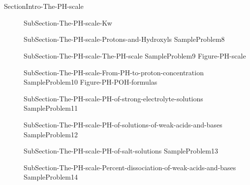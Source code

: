 \documentclass[main.tex]{subfiles}
\newcommand\chapterlabel{Ch-acidbase}\setcounter{figurenewcounter}{0}\setcounter{tablenewcounter}{0}\setcounter{formulanewcounter}{0}
\begin{document}
\section{\color{blue!30!black}{The PH scale}}{SectionIntro-The-PH-scale}
\sloppy
\begin{description}
\item[] {SubSection-The-PH-scale-Kw}
\item[] {SubSection-The-PH-scale-Protons-and-Hydroxyls}
  {SampleProblem8}
\item[] {SubSection-The-PH-scale-The-PH-scale}
  {SampleProblem9}
  {Figure-PH-scale}
\item[] {SubSection-The-PH-scale-From-PH-to-proton-concentration}
  {SampleProblem10}
  {Figure-PH-POH-formulas}
\item[] {SubSection-The-PH-scale-PH-of-strong-electrolyte-solutions}
  {SampleProblem11}
\item[] {SubSection-The-PH-scale-PH-of-solutions-of-weak-acids-and-bases}
  {SampleProblem12}
  
  
\item[] {SubSection-The-PH-scale-PH-of-salt-solutions}
  {SampleProblem13}
\item[] {SubSection-The-PH-scale-Percent-dissociation-of-weak-acids-and-bases}
  {SampleProblem14}
\end{description}
\end{document}
